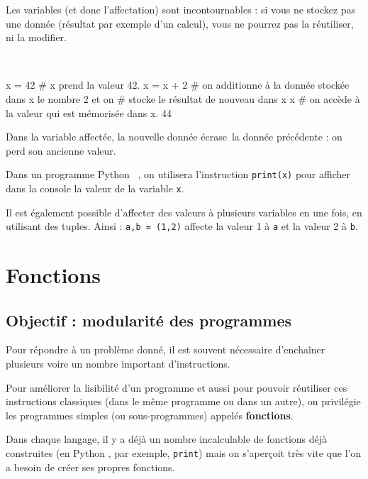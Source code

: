 Les variables (et donc l'affectation) sont incontournables : si vous ne stockez pas une donnée 
(résultat par exemple d'un calcul), vous ne pourrez pas la réutiliser, ni la modifier.



\begin{xxpyconsole}~\\ \vspace{-.5cm}%
\begin{pyconsole}
x = 42       # x prend la valeur 42.
x = x + 2	# on additionne à la donnée stockée dans x le nombre 2 et on 
             # stocke le résultat de nouveau dans x 
x            # on accède à la valeur qui est mémorisée dans x.
44
\end{pyconsole}
\end{xxpyconsole}

Dans la variable affectée, la nouvelle donnée \og écrase\fg\ la donnée précédente : on perd son 
ancienne valeur.

Dans un programme Python \ , on utilisera l'instruction \texttt{print(x)}
pour afficher dans la console la valeur de la variable \texttt{x}.

Il est également possible d'affecter des valeurs à plusieurs variables en une fois, en utilisant 
des tuples. Ainsi : \texttt{a,b = (1,2)} affecte la valeur 1 à \texttt{a} et la valeur 2 à 
\texttt{b}.




\section{Fonctions}
\subsection{Objectif : modularité des programmes}

Pour répondre à un problème donné, il est souvent nécessaire d'enchaîner plusieurs voire un nombre 
important d'instructions.

Pour améliorer la lisibilité d'un programme et aussi pour pouvoir réutiliser 
ces instructions classiques (dans le même programme ou dans un autre),
on privilégie les programmes simples (ou sous-programmes) appelés \textbf{fonctions}.

Dans chaque langage, il y a déjà un nombre incalculable de fonctions déjà construites (en Python , 
par exemple, \texttt{print}) mais on s'aperçoit très vite que l'on a besoin de créer ses propres 
fonctions.


